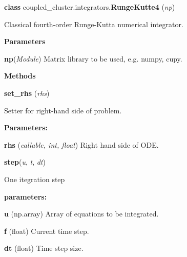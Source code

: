 \begin{tcolorbox}
    {\selectfont
    \textbf{class} coupled\_cluster.integrators.\textbf{RungeKutte4}
    (\emph{np})

    \vspace{1em}
    Classical fourth-order Runge-Kutta numerical integrator.

    \vspace{1em}
    \textbf{Parameters}

    \hspace{2em}\textbf{np}(\emph{Module})
        Matrix library to be used, e.g. numpy, cupy.

    \vspace{1em} 
    \textbf{Methods}

    \hspace{2em} \textbf{set\_rhs} (\emph{rhs})

        \begin{adjustwidth}{4em}{}
        Setter for right-hand side of problem.

        \textbf{Parameters:} 

            \hspace{1.5em}\textbf{rhs} (\emph{callable, int, float}) 
                Right hand side of ODE.

        \end{adjustwidth}

        \hspace{2em} \textbf{step}(\emph{u}, \emph{t}, \emph{dt})

        \begin{adjustwidth}{4em}{}
        One itegration step

        \textbf{parameters:} 
        
            \hspace{1.5em} \textbf{u} (np.array) Array of equations to be integrated.

            \hspace{1.5em} \textbf{f} (float) Current time step.

            \hspace{1.5em} \textbf{dt} (float) Time step size.

        \end{adjustwidth}



    } 
\end{tcolorbox}
